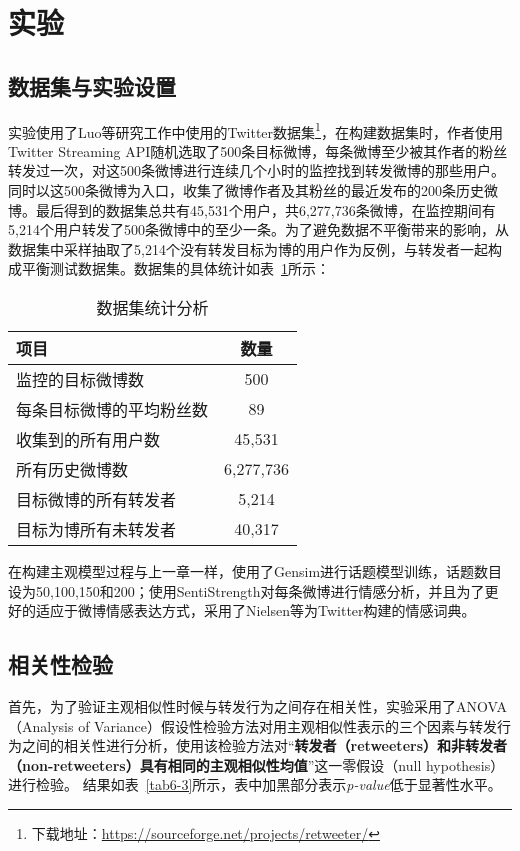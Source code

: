 \section{实验}
\label{experiments}

\subsection{数据集与实验设置}
实验使用了Luo等研究工作中使用的Twitter数据集\footnote{下载地址：\url{https://sourceforge.net/projects/retweeter/}}，在构建数据集时，作者使用Twitter Streaming API随机选取了500条目标微博，每条微博至少被其作者的粉丝转发过一次，对这500条微博进行连续几个小时的监控找到转发微博的那些用户。同时以这500条微博为入口，收集了微博作者及其粉丝的最近发布的200条历史微博。最后得到的数据集总共有45,531个用户，共6,277,736条微博，在监控期间有5,214个用户转发了500条微博中的至少一条。为了避免数据不平衡带来的影响，从数据集中采样抽取了5,214个没有转发目标为博的用户作为反例，与转发者一起构成平衡测试数据集。数据集的具体统计如表~\ref{tab6-2}所示：
\begin{table}[htb]
\centering
\caption{数据集统计分析}
\label{tab6-2}
\begin{tabular}{|l|c|}
\hline
项目 &数量\\
\hline
监控的目标微博数 & 500 \\
\hline
每条目标微博的平均粉丝数 & 89 \\
\hline
收集到的所有用户数 & 45,531 \\
\hline
所有历史微博数 & 6,277,736 \\
\hline
目标微博的所有转发者 & 5,214 \\
\hline
目标为博所有未转发者 & 40,317  \\
\hline
\end{tabular}
\end{table}

在构建主观模型过程与上一章一样，使用了Gensim进行话题模型训练，话题数目设为50,100,150和200；使用SentiStrength对每条微博进行情感分析，并且为了更好的适应于微博情感表达方式，采用了Nielsen等为Twitter构建的情感词典。

\subsection{相关性检验}
首先，为了验证主观相似性时候与转发行为之间存在相关性，实验采用了ANOVA（Analysis of Variance）假设性检验方法对用主观相似性表示的三个因素与转发行为之间的相关性进行分析，使用该检验方法对“\textbf{转发者（retweeters）和非转发者（non-retweeters）具有相同的主观相似性均值}”这一零假设（null hypothesis）进行检验。
结果如表~\ref{tab6-3}所示，表中加黑部分表示\textit{p-value}低于显著性水平。

